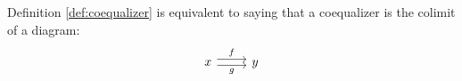 \begin{definition}
  Definition \ref{def:coequalizer} is equivalent to saying that a coequalizer is
  the colimit of a diagram:
  \[\begin{tikzcd}[ampersand replacement=\&]
    x \& y
    \arrow["f", shift left=1, from=1-1, to=1-2]
    \arrow["g"', shift right=1, from=1-1, to=1-2]
  \end{tikzcd}\]
\end{definition}